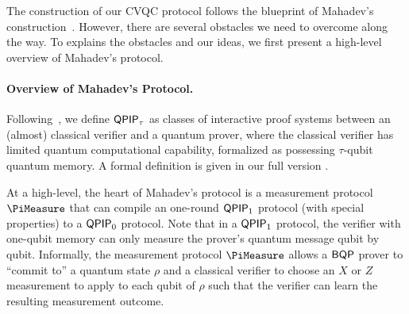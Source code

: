 

% 


The construction of our CVQC protocol follows the blueprint of Mahadev's construction~\cite{FOCS:Mahadev18a}. However, there are several obstacles we need to overcome along the way. To explains the obstacles and our ideas, we first present a high-level overview of Mahadev's protocol.



\paragraph{Overview of Mahadev's Protocol.}
%
Following~\cite{FOCS:Mahadev18a}, we define $\operatorname{\mathsf{QPIP}}_{\tau}$ as classes of interactive proof systems between an (almost) classical verifier and a quantum prover, where the classical verifier has limited quantum computational capability, formalized as possessing $\tau$-qubit quantum memory. %
A formal definition is given in our full version \cite{full-version}.

At a high-level, the heart of Mahadev's protocol is a measurement protocol $\PiMeasure$ that can compile an one-round $\operatorname{\mathsf{QPIP}}_1$ protocol (with special properties) to a $\operatorname{\mathsf{QPIP}}_0$ protocol. Note that in a $\operatorname{\mathsf{QPIP}}_1$ protocol, the verifier with one-qubit memory can only measure the prover's quantum message qubit by qubit. Informally, the measurement protocol $\PiMeasure$ allows a $\operatorname{\mathsf{BQP}}$ prover to ``commit to'' a quantum state $\rho$ and a classical verifier to choose an $X$ or $Z$ measurement to apply to each qubit of $\rho$ such that the verifier can learn the resulting measurement outcome. 

